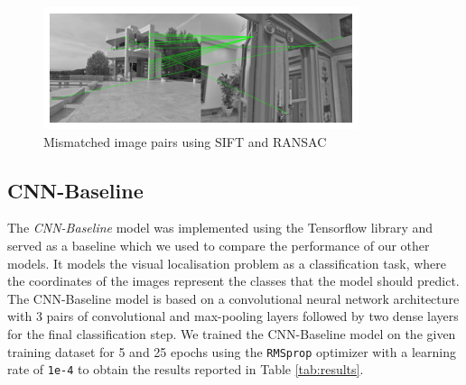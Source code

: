 \documentclass[conference]{IEEEtran}
\begin{document}
\begin{figure}[htbp]
\centerline{\includegraphics[scale=0.7]{Pics/SIFT Mismatches.png}}
\caption{Mismatched image pairs using SIFT and RANSAC}
\label{fig:SIFT}
\end{figure}

\subsection{CNN-Baseline}
The \textit{CNN-Baseline} model was implemented using the Tensorflow \cite{b8} library and served as a baseline which we used to compare the performance of our other models. It models the visual localisation problem as a classification task, where the coordinates of the images represent the classes that the model should predict. The CNN-Baseline model is based on a convolutional neural network architecture with 3 pairs of convolutional and max-pooling layers followed by two dense layers for the final classification step. We trained the CNN-Baseline model on the given training dataset for 5 and 25 epochs using the \texttt{RMSprop} optimizer with a learning rate of \texttt{1e-4} to obtain the results reported in Table \ref{tab:results}.
\end{document}
